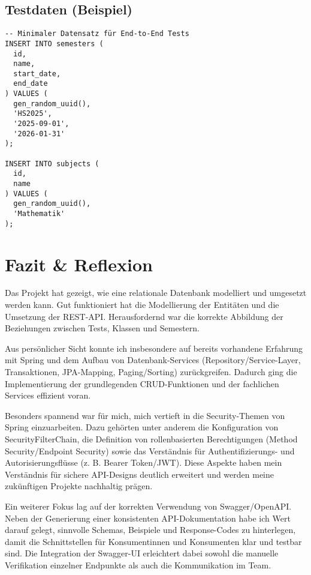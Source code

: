 \documentclass[12pt,a4paper]{article}
\begin{document}
    \subsection{Testdaten (Beispiel)}
    \begin{lstlisting}
-- Minimaler Datensatz für End-to-End Tests
INSERT INTO semesters (
  id,
  name,
  start_date,
  end_date
) VALUES (
  gen_random_uuid(),
  'HS2025',
  '2025-09-01',
  '2026-01-31'
);

INSERT INTO subjects (
  id,
  name
) VALUES (
  gen_random_uuid(),
  'Mathematik'
);

    \end{lstlisting}

    \section{Fazit \& Reflexion}
    Das Projekt hat gezeigt, wie eine relationale Datenbank modelliert und umgesetzt werden kann.
    Gut funktioniert hat die Modellierung der Entitäten und die Umsetzung der REST-API.
    Herausfordernd war die korrekte Abbildung der Beziehungen zwischen Tests, Klassen und Semestern.

    Aus persönlicher Sicht konnte ich insbesondere auf bereits vorhandene Erfahrung mit Spring und
    dem Aufbau von Datenbank-Services (Repository/Service-Layer, Transaktionen, JPA-Mapping,
    Paging/Sorting) zurückgreifen. Dadurch ging die Implementierung der grundlegenden CRUD-Funktionen
    und der fachlichen Services effizient voran.

    Besonders spannend war für mich, mich vertieft in die Security-Themen von Spring einzuarbeiten.
    Dazu gehörten unter anderem die Konfiguration von SecurityFilterChain, die Definition von
    rollenbasierten Berechtigungen (Method Security/Endpoint Security) sowie das Verständnis für
    Authentifizierungs- und Autorisierungsflüsse (z. B. Bearer Token/JWT). Diese Aspekte haben mein
    Verständnis für sichere API-Designs deutlich erweitert und werden meine zukünftigen Projekte
    nachhaltig prägen.

    Ein weiterer Fokus lag auf der korrekten Verwendung von Swagger/OpenAPI. Neben der Generierung
    einer konsistenten API-Dokumentation habe ich Wert darauf gelegt, sinnvolle Schemas, Beispiele
    und Response-Codes zu hinterlegen, damit die Schnittstellen für Konsumentinnen und Konsumenten
    klar und testbar sind. Die Integration der Swagger-UI erleichtert dabei sowohl die manuelle
    Verifikation einzelner Endpunkte als auch die Kommunikation im Team.
\end{document}
